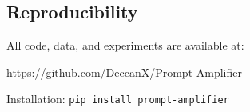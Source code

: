 \documentclass[11pt,a4paper]{article}
\begin{document}
\subsection{Reproducibility}

All code, data, and experiments are available at:
\begin{center}
\url{https://github.com/DeccanX/Prompt-Amplifier}
\end{center}

Installation: \texttt{pip install prompt-amplifier}



\end{document}
